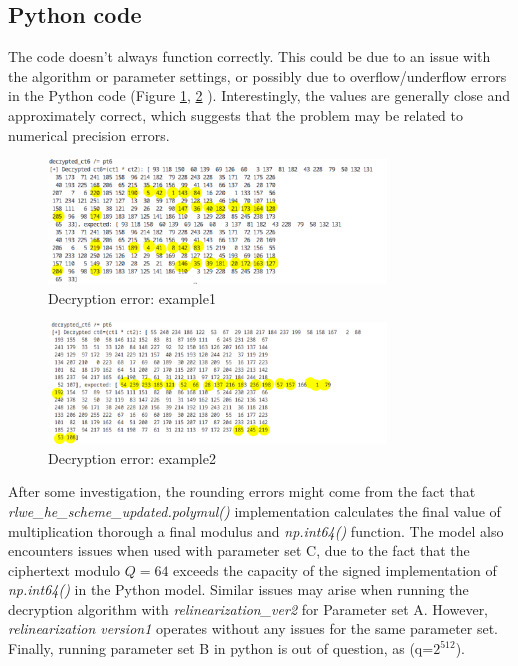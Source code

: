 \documentclass{article}
\begin{document}
   \subsection{Python code}

   The code doesn't always function correctly. This could be due to an issue with the algorithm or parameter settings, or possibly due to overflow/underflow errors in the Python code (Figure \ref{fig:errored_dec1}, \ref{fig:errored_dec2} ). Interestingly, the values are generally close and approximately correct, which suggests that the problem may be related to numerical precision errors.

      \begin{figure}[hbtp] 
            \centering
            \includegraphics[width=0.8\textwidth]{errored_decryption.png} 
            \caption{Decryption error: example1} 
            \label{fig:errored_dec1}
      \end{figure}

      \begin{figure}[htpb] 
            \centering
            \includegraphics[width=0.8\textwidth]{errored_decryption2.png}
            \caption{Decryption error: example2}
            \label{fig:errored_dec2} 
      \end{figure}

      After some investigation, the rounding errors might come from the fact that \textit{rlwe\_he\_scheme\_updated.polymul()} implementation calculates the final value of multiplication thorough a final modulus and \textit{np.int64()} function. The model also encounters issues when used with parameter set C, due to the fact that the ciphertext modulo \(Q = 64\) exceeds the capacity of the signed implementation of \textit{np.int64()} in the Python model. Similar issues may arise when running the decryption algorithm with \textit{relinearization\_ver2} for Parameter set A. However, \textit{relinearization version1} operates without any issues for the same parameter set. Finally, running parameter set B in python is out of question, as (q=$2^{512}$).
\end{document}
